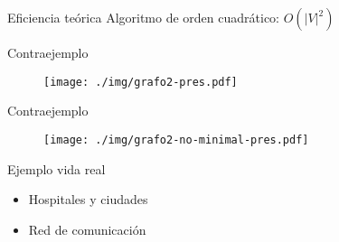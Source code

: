 \documentclass[spanish]{beamer}
\begin{document}
\begin{frame}{Eficiencia teórica}
	Algoritmo de orden cuadrático: $O(|V|^2)$
	

\end{frame}

\begin{frame}{Contraejemplo}

	\begin{figure}[H]
		\centering \texttt{[image: ./img/grafo2-pres.pdf]}
	\end{figure}
\end{frame}

\begin{frame}{Contraejemplo}

	\begin{figure}[H]
		\centering \texttt{[image: ./img/grafo2-no-minimal-pres.pdf]}
	\end{figure}
\end{frame}

\begin{frame}{Ejemplo vida real}
	\begin{itemize}
		\item Hospitales y ciudades
		\item Red de comunicación
	\end{itemize}
\end{frame}
\end{document}
